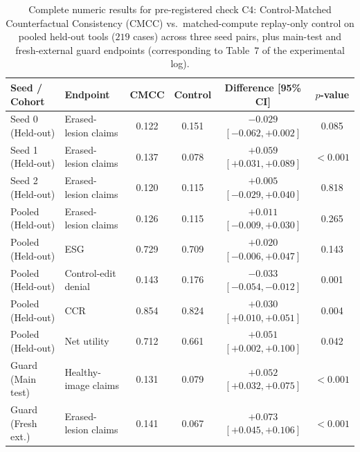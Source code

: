 \documentclass{article} %
\begin{document}
\begin{table}[h]
\caption{Complete numeric results for pre-registered check C4: Control-Matched Counterfactual Consistency (CMCC) vs.\ matched-compute replay-only control on pooled held-out tools ($219$ cases) across three seed pairs, plus main-test and fresh-external guard endpoints (corresponding to Table~7 of the experimental log).}
\label{tab:app_c4_cmcc}
\begin{center}
\small
\begin{tabular}{llcccc}
\toprule
\textbf{Seed / Cohort} & \textbf{Endpoint} & \textbf{CMCC} & \textbf{Control} & \textbf{Difference [95\% CI]} & \textbf{$p$-value} \\
\midrule
Seed 0 (Held-out) & Erased-lesion claims & 0.122 & 0.151 & $-0.029$ $[-0.062, +0.002]$ & 0.085 \\
Seed 1 (Held-out) & Erased-lesion claims & 0.137 & 0.078 & $+0.059$ $[+0.031, +0.089]$ & $<0.001$ \\
Seed 2 (Held-out) & Erased-lesion claims & 0.120 & 0.115 & $+0.005$ $[-0.029, +0.040]$ & 0.818 \\
\midrule
Pooled (Held-out) & Erased-lesion claims & 0.126 & 0.115 & $+0.011$ $[-0.009, +0.030]$ & 0.265 \\
Pooled (Held-out) & ESG & 0.729 & 0.709 & $+0.020$ $[-0.006, +0.047]$ & 0.143 \\
Pooled (Held-out) & Control-edit denial & 0.143 & 0.176 & $-0.033$ $[-0.054, -0.012]$ & 0.001 \\
Pooled (Held-out) & CCR & 0.854 & 0.824 & $+0.030$ $[+0.010, +0.051]$ & 0.004 \\
Pooled (Held-out) & Net utility & 0.712 & 0.661 & $+0.051$ $[+0.002, +0.100]$ & 0.042 \\
\midrule
Guard (Main test) & Healthy-image claims & 0.131 & 0.079 & $+0.052$ $[+0.032, +0.075]$ & $<0.001$ \\
Guard (Fresh ext.) & Erased-lesion claims & 0.141 & 0.067 & $+0.073$ $[+0.045, +0.106]$ & $<0.001$ \\
\bottomrule
\end{tabular}
\end{center}
\end{table}
\end{document}
